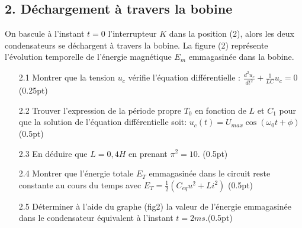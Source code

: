 \documentclass[12pt]{article}
\begin{document}
\begin{center}
 
  \vspace{-0.4cm}


\end{center}

\vspace{-1cm}
\subsection*{2. Déchargement à travers la bobine}
     On bascule à l’instant $t = 0$ l’interrupteur $K$ dans la position (2), alors les deux condensateurs se déchargent à travers la bobine. La figure (2) représente l’évolution temporelle de l’énergie magnétique $E_m$ emmagasinée dans la bobine.

     \begin{enumerate}
       \item[2.1] Montrer que la tension $u_c$ vérifie l'équation différentielle :
$    \frac{d^2 u_c}{dt^2} + \frac{1}{LC} u_c = 0$\dotfill(0.25pt)

    \item[2.2] Trouver l’expression de la période propre $T_0$ en fonction de $L$ et $C_1$ pour que la solution de l’équation différentielle soit:
      $
    u_c(t) = U_{{max}} \cos \left(\omega_0 t + \phi \right)
   $ \dotfill(0.5pt)
 \item[2.3] En déduire que $L = 0,4H$ en prenant $\pi^2 = 10$. \dotfill(0.5pt)    
    \item[2.4] Montrer que l’énergie totale $E_T$ emmagasinée dans le circuit reste constante au cours du temps avec    $
    E_T = \frac{1}{2} \left( C_{{eq}} u^2 + L i^2 \right)
   $ \dotfill(0.5pt)

    \item[2.5] Déterminer à l’aide du graphe (fig2) la valeur de l’énergie emmagasinée dans le condensateur équivalent à l’instant $t = 2ms$.\dotfill(0.5pt)

     \end{enumerate}
\end{document}
